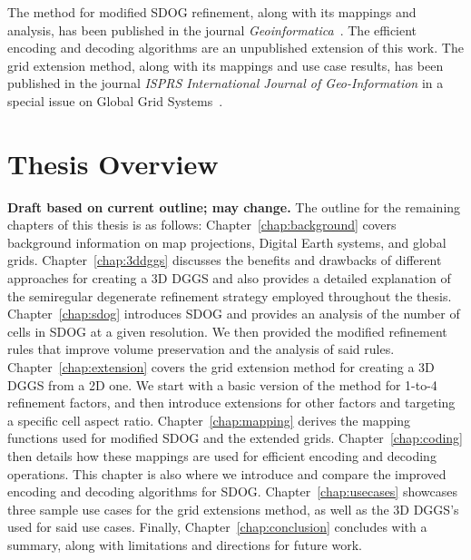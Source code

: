 The method for modified SDOG refinement, along with its mappings and analysis, has been published in the journal \textit{Geoinformatica}~\cite{ulmer2020toward}.
The efficient encoding and decoding algorithms are an unpublished extension of this work.
The grid extension method, along with its mappings and use case results, has been published in the journal \textit{ISPRS International Journal of Geo-Information} in a special issue on Global Grid Systems~\cite{ulmer2020general}.


\section{Thesis Overview} \label{chap:1:overview}
\textbf{Draft based on current outline; may change.}
The outline for the remaining chapters of this thesis is as follows:
Chapter~\ref{chap:background} covers background information on map projections, Digital Earth systems, and global grids.
Chapter~\ref{chap:3ddggs} discusses the benefits and drawbacks of different approaches for creating a 3D DGGS and also provides a detailed explanation of the semiregular degenerate refinement strategy employed throughout the thesis.
Chapter~\ref{chap:sdog} introduces SDOG and provides an analysis of the number of cells in SDOG at a given resolution.
We then provided the modified refinement rules that improve volume preservation and the analysis of said rules.
Chapter~\ref{chap:extension} covers the grid extension method for creating a 3D DGGS from a 2D one.
We start with a basic version of the method for 1-to-4 refinement factors, and then introduce extensions for other factors and targeting a specific cell aspect ratio.
Chapter~\ref{chap:mapping} derives the mapping functions used for modified SDOG and the extended grids.
Chapter~\ref{chap:coding} then details how these mappings are used for efficient encoding and decoding operations.
This chapter is also where we introduce and compare the improved encoding and decoding algorithms for SDOG.
Chapter~\ref{chap:usecases} showcases three sample use cases for the grid extensions method, as well as the 3D DGGS's used for said use cases.
Finally, Chapter~\ref{chap:conclusion} concludes with a summary, along with limitations and directions for future work.
